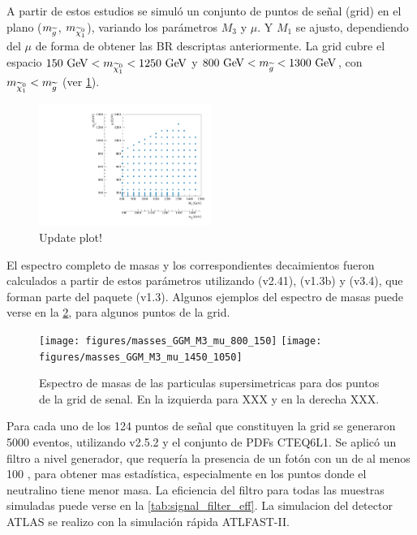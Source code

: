 A partir de estos estudios se simuló un conjunto de puntos de señal (grid) en el plano
($m_{\widetilde{g}}$, $m_{\ninoone}$), variando los parámetros $M_3$ y $\mu$. Y $M_1$
se ajusto, dependiendo del $\mu$ de forma de obtener las BR descriptas
anteriormente. La grid cubre el espacio $150\gev < m_{\ninoone} < 1250 \gev$ y
$800\gev < m_{\gluino} < 1300 \gev$, con $m_{\ninoone} < m_{\gluino}$ (ver
\cref{fig:gridpoints}).


\begin{figure}[!htbp]
  \centering
  \includegraphics[width=0.5\textwidth]{figures/run1_grid}
  \caption{Update plot!}
  \label{fig:gridpoints}
\end{figure}


El espectro completo de masas y los correspondientes decaimientos fueron
calculados a partir de estos parámetros utilizando {\suspect}
(v2.41)\cite{Djouadi2007426}, {\sdecay} (v1.3b)\cite{Muhlleitner:2004mka} y
{\hdecay} (v3.4)\cite{Djouadi:1997yw}, que forman parte del paquete {\susyhit}
(v1.3)\cite{Djouadi:2006bz}. Algunos ejemplos del espectro de masas puede verse
en la \cref{fig:mass_spectra}, para algunos puntos de la grid.

\begin{figure}[!htbp]
   \centering
   \texttt{[image: figures/masses\_GGM\_M3\_mu\_800\_150]}
   \texttt{[image: figures/masses\_GGM\_M3\_mu\_1450\_1050]}

   \caption{Espectro de masas de las particulas supersimetricas para dos puntos de la grid de senal.
     En la izquierda para XXX y en la derecha XXX.}
   \label{fig:mass_spectra}
\end{figure}

Para cada uno de los 124 puntos de señal que constituyen la grid se generaron
5000 eventos, utilizando {\herwigpp} v2.5.2\cite{Bahr:2008pv} y el conjunto de
PDFs CTEQ6L1\cite{Nadolsky:2008zw}. Se aplicó un filtro a nivel generador, que
requería la presencia de un fotón con un {\pt} de al menos 100 \gev, para
obtener mas estadística, especialmente en los puntos donde el
neutralino tiene menor masa. La eficiencia del filtro para todas las muestras
simuladas puede verse en la \cref{tab:signal_filter_eff}. La simulacion del
detector ATLAS se realizo con la simulación rápida
\textsc{ATLFAST-II}\cite{Richter-Was:683751}.



